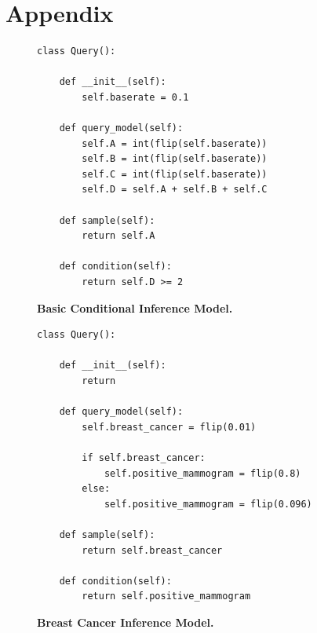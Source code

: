 \documentclass[12pt,letterpaper]{article}
\begin{document}


\setlength{\bibleftmargin}{.125in}
\setlength{\bibindent}{-\bibleftmargin}



\newpage
\section{Appendix}

\begin{figure}[h!]
\begin{verbatim}
class Query():

    def __init__(self):
        self.baserate = 0.1

    def query_model(self):
        self.A = int(flip(self.baserate))
        self.B = int(flip(self.baserate))
        self.C = int(flip(self.baserate))
        self.D = self.A + self.B + self.C

    def sample(self):
        return self.A

    def condition(self):
        return self.D >= 2
\end{verbatim}
\caption{\small\textbf{Basic Conditional Inference Model.}}
\label{fig:test1model}
\end{figure}

\begin{figure}[h!]
\begin{verbatim}
class Query():

    def __init__(self):
        return

    def query_model(self):
        self.breast_cancer = flip(0.01)

        if self.breast_cancer:
            self.positive_mammogram = flip(0.8)
        else:
            self.positive_mammogram = flip(0.096)

    def sample(self):
        return self.breast_cancer

    def condition(self):
        return self.positive_mammogram
\end{verbatim}
\caption{\small\textbf{Breast Cancer Inference Model.}}
\label{fig:test2model}
\end{figure}
\end{document}
